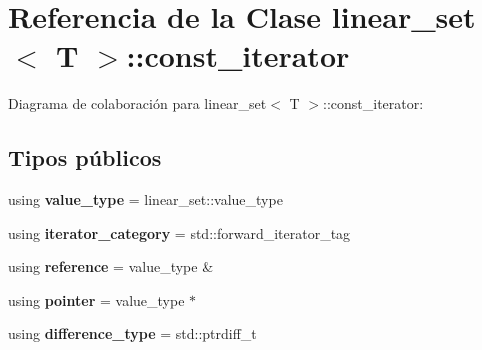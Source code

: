 \hypertarget{classlinear__set_1_1const__iterator}{}\section{Referencia de la Clase linear\+\_\+set$<$ T $>$\+:\+:const\+\_\+iterator}
\label{classlinear__set_1_1const__iterator}


Diagrama de colaboración para linear\+\_\+set$<$ T $>$\+:\+:const\+\_\+iterator\+:
\subsection*{Tipos públicos}
\begin{DoxyCompactItemize}
\item 
\mbox{\label{classlinear__set_1_1const__iterator_aeeb487937ec4d79cb6a1a08e73ac1f99}} 
using {\bfseries value\+\_\+type} = linear\+\_\+set\+::value\+\_\+type
\item 
\mbox{\label{classlinear__set_1_1const__iterator_aa1f033d1d6817bba87a8a56db432f2e0}} 
using {\bfseries iterator\+\_\+category} = std\+::forward\+\_\+iterator\+\_\+tag
\item 
\mbox{\label{classlinear__set_1_1const__iterator_a081f0692047d474e34e1ce924d3485ee}} 
using {\bfseries reference} = value\+\_\+type \&
\item 
\mbox{\label{classlinear__set_1_1const__iterator_acdc3e59c21faf9becf4c4dcf4ca1bef2}} 
using {\bfseries pointer} = value\+\_\+type $\ast$
\item 
\mbox{\label{classlinear__set_1_1const__iterator_ab68189d3b549fd08aea83d540cb7a1b0}} 
using {\bfseries difference\+\_\+type} = std\+::ptrdiff\+\_\+t
\end{DoxyCompactItemize}
